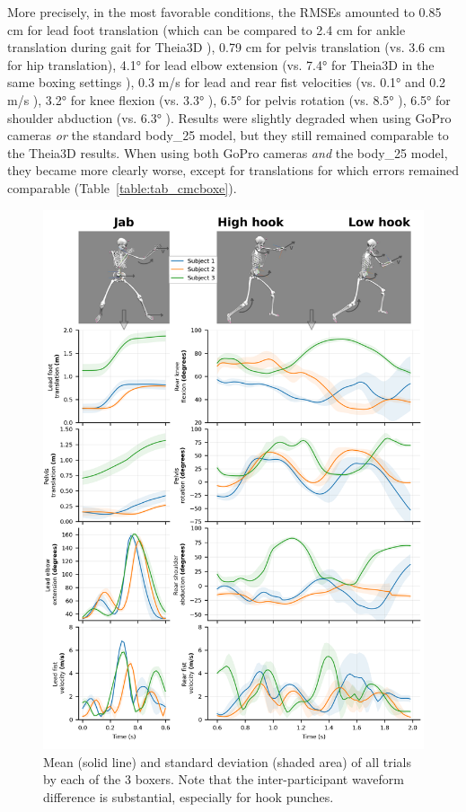 More precisely, in the most favorable conditions, the RMSEs amounted to 0.85 cm for lead foot translation (which can be compared to 2.4 cm for ankle translation during gait for Theia3D \cite{Kanko2021b}), 0.79 cm for pelvis translation (vs. 3.6 cm for hip translation), 4.1° for lead elbow extension (vs. 7.4° for Theia3D in the same boxing settings \cite{Lahkar2022b}), 0.3 m/s for lead and rear fist velocities (vs. 0.1° and 0.2 m/s \cite{Lahkar2022b}), 3.2° for knee flexion (vs. 3.3° \cite{Kanko2021b}), 6.5° for pelvis rotation (vs. 8.5° \cite{Kanko2021b}), 6.5° for shoulder abduction (vs. 6.3° \cite{Lahkar2022b}). Results were slightly degraded when using GoPro cameras \emph{or} the standard body\_25 model, but they still remained comparable to the Theia3D results. When using both GoPro cameras \emph{and} the body\_25 model, they became more clearly worse, except for translations for which errors remained comparable (Table~\ref{table:tab_cmcboxe}).

\begin{figure}[!ht]
	\centering
	\def\svgwidth{1\columnwidth}
	\fontsize{10pt}{10pt}\selectfont
	\includegraphics[width=1\linewidth]{"../Chap6/Figures/Fig_CompBoxers.png"}
	\caption{Mean (solid line) and standard deviation (shaded area) of all trials by each of the 3 boxers. Note that the inter-participant waveform difference is substantial, especially for hook punches.}
	\label{fig_compbox}
\end{figure}


